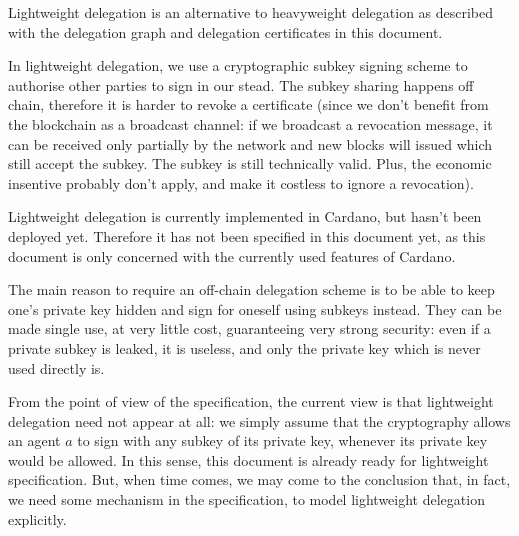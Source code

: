 \documentclass{article}
\begin{document}
Lightweight delegation is an alternative to heavyweight delegation as
described with the delegation graph and delegation certificates in
this document.

In lightweight delegation, we use a cryptographic subkey signing
scheme to authorise other parties to sign in our stead. The subkey
sharing happens off chain, therefore it is harder to revoke a
certificate (since we don't benefit from the blockchain as a broadcast
channel: if we broadcast a revocation message, it can be received only
partially by the network and new blocks will issued which still accept
the subkey. The subkey is still technically valid. Plus, the economic
insentive probably don't apply, and make it costless to ignore a
revocation).

Lightweight delegation is currently implemented in Cardano, but hasn't
been deployed yet. Therefore it has not been specified in this
document yet, as this document is only concerned with the currently
used features of Cardano.

The main reason to require an off-chain delegation scheme is to be
able to keep one's private key hidden and sign for oneself using
subkeys instead. They can be made single use, at very little cost,
guaranteeing very strong security: even if a private subkey is leaked,
it is useless, and only the private key which is never used directly
is.

From the point of view of the specification, the current view is that
lightweight delegation need not appear at all: we simply assume that
the cryptography allows an agent $a$ to sign with any subkey of its
private key, whenever its private key would be allowed. In this sense,
this document is already ready for lightweight specification. But,
when time comes, we may come to the conclusion that, in fact, we need
some mechanism in the specification, to model lightweight delegation
explicitly.
\end{document}
